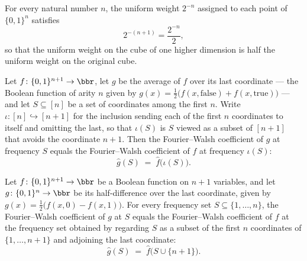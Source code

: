 \begin{lemma}
\leanok
{}
\label{BooleanAnalysis.Hypercontractivity.uniformWeight_succ}
For every natural number $n$, the uniform weight $2^{-n}$ assigned to each point of
$\{0,1\}^n$ satisfies \[2^{-(n+1)} = \frac{2^{-n}}{2},\] so that the uniform weight on
the cube of one higher dimension is half the uniform weight on the original cube.
\end{lemma}

\begin{lemma}
\leanok
{}
\label{BooleanAnalysis.Hypercontractivity.fourierCoeff_avgLast}
Let $f\colon\{0,1\}^{n+1}\to\bbr$, let $g$ be the average of $f$ over its
last coordinate — the Boolean function of arity $n$ given by $g(x) =
\tfrac12\bigl(f(x,\text{false}) + f(x,\text{true})\bigr)$ — and let $S \subseteq [n]$ be
a set of coordinates among the first $n$. Write $\iota\colon [n] \hookrightarrow [n+1]$
for the inclusion sending each of the first $n$ coordinates to itself and omitting the
last, so that $\iota(S)$ is $S$ viewed as a subset of $[n+1]$ that avoids the coordinate
$n+1$. Then the Fourier–Walsh coefficient of $g$ at frequency $S$ equals the
Fourier–Walsh coefficient of $f$ at frequency $\iota(S)$: \[ \hat g(S) \;=\; \hat
f\bigl(\iota(S)\bigr). \]
\end{lemma}

\begin{lemma}
\leanok
{}
\label{BooleanAnalysis.Hypercontractivity.fourierCoeff_diffLast}
Let $f\colon\{0,1\}^{n+1}\to\bbr$ be a Boolean function on $n+1$ variables, and let
$g\colon\{0,1\}^{n}\to\bbr$ be its half-difference over the last coordinate, given by
$g(x)=\tfrac12\bigl(f(x,0)-f(x,1)\bigr)$. For every frequency set
$S\subseteq\{1,\dots,n\}$, the Fourier--Walsh coefficient of $g$ at $S$ equals the
Fourier--Walsh coefficient of $f$ at the frequency set obtained by regarding $S$ as a
subset of the first $n$ coordinates of $\{1,\dots,n+1\}$ and adjoining the last
coordinate:
\[
  \hat g(S) \;=\; \hat f\bigl(S\cup\{n+1\}\bigr).
\]
\end{lemma}


